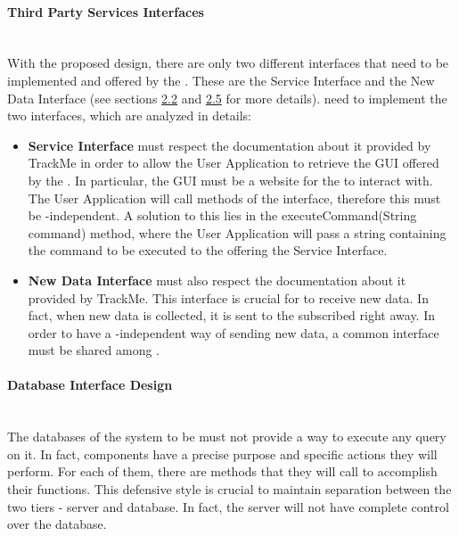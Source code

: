 \documentclass[../../DD.tex]{subfiles}
\begin{document}
	\paragraph{Third Party Services Interfaces}\mbox{}\\
	With the proposed design, there are only two different interfaces that need to be implemented and offered by the . These are the Service Interface and the New Data Interface (see sections \hyperref[sect:2.2]{2.2} and \hyperref[sect:2.5]{2.5} for more details).
	 need to implement the two interfaces, which are analyzed in details:
	\begin{itemize}
		\item \textbf{Service Interface} must respect the documentation about it provided by TrackMe in order to allow the User Application to retrieve the GUI offered by the . In particular, the GUI must be a website for the  to interact with. The User Application will call methods of the interface, therefore this must be -independent. A solution to this lies in the executeCommand(String command) method, where the User Application will pass a string containing the command to be executed to the  offering the Service Interface.
		\item \textbf{New Data Interface} must also respect the documentation about it provided by TrackMe. This interface is crucial for  to receive new data. In fact, when new data is collected, it is sent to the subscribed  right away. In order to have a -independent way of sending new data, a common interface must be shared among .
	\end{itemize}

	\paragraph{Database Interface Design}\mbox{}\\
	The databases of the system to be must not provide a way to execute any query on it. In fact, components have a precise purpose and specific actions they will perform. For each of them, there are methods that they will call to accomplish their functions. This defensive style is crucial to maintain separation between the two tiers - server and database. In fact, the server will not have complete control over the database.
\end{document}
